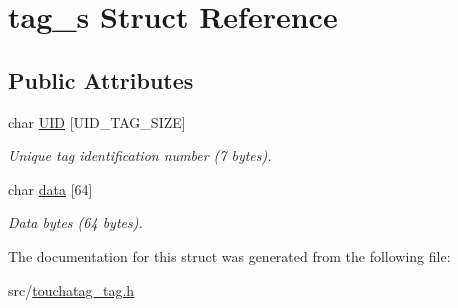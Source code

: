 \hypertarget{structtag__s}{
\section{tag\_\-s Struct Reference}
\label{structtag__s}
}
\subsection*{Public Attributes}
\begin{DoxyCompactItemize}
\item 
\hypertarget{structtag__s_ac51bde8610372111a7b920d504313e6f}{
char \hyperlink{structtag__s_ac51bde8610372111a7b920d504313e6f}{UID} \mbox{[}UID\_\-TAG\_\-SIZE\mbox{]}}
\label{structtag__s_ac51bde8610372111a7b920d504313e6f}

\begin{DoxyCompactList}\small\item\em Unique tag identification number (7 bytes). \item\end{DoxyCompactList}\item 
\hypertarget{structtag__s_a08370dba85049ffd3b37fd1156c3c6ed}{
char \hyperlink{structtag__s_a08370dba85049ffd3b37fd1156c3c6ed}{data} \mbox{[}64\mbox{]}}
\label{structtag__s_a08370dba85049ffd3b37fd1156c3c6ed}

\begin{DoxyCompactList}\small\item\em Data bytes (64 bytes). \item\end{DoxyCompactList}\end{DoxyCompactItemize}


The documentation for this struct was generated from the following file:\begin{DoxyCompactItemize}
\item 
src/\hyperlink{touchatag__tag_8h}{touchatag\_\-tag.h}\end{DoxyCompactItemize}

